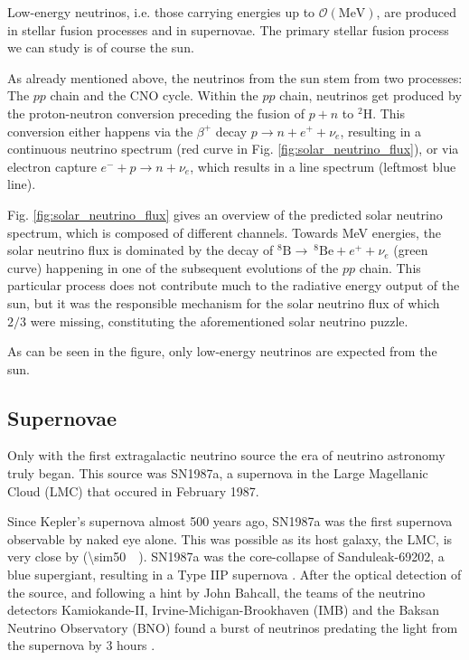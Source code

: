 \documentclass[
    a4paper, %
    fontsize=10pt, %
    twoside=false, %
    numbers=noenddot, %
    fontmethod=tex,
]{kaobook}
\begin{document}
Low-energy neutrinos, i.e. those carrying energies up to $\mathcal{O}(\unit{\mega\eV})$, are produced in stellar fusion processes and in supernovae. The primary stellar fusion process we can study is of course the sun.

As already mentioned above, the neutrinos from the sun stem from two processes: The $pp$ chain and the CNO cycle. Within the $pp$ chain, neutrinos get produced by the proton-neutron conversion preceding the fusion of $p+n$ to $^2 \text{H}$. This conversion either happens via the $\beta^+$ decay $p \rightarrow n + e^+ + \nu_e$, resulting in a continuous neutrino spectrum (red curve in Fig. \ref{fig:solar_neutrino_flux}), or via electron capture $e^- + p \rightarrow n + \nu_e$, which results in a line spectrum (leftmost blue line).

Fig. \ref{fig:solar_neutrino_flux} gives an overview of the predicted solar neutrino spectrum, which is composed of different channels. Towards \unit{\mega\eV} energies, the solar neutrino flux is dominated by the decay of $^8\text{B}\rightarrow ~^8\text{Be} + e^+ + \nu_e$ (green curve) happening in one of the subsequent evolutions of the $pp$ chain. This particular process does not contribute much to the radiative energy output of the sun, but it was the responsible mechanism for the solar neutrino flux of which $2/3$ were missing, constituting the aforementioned solar neutrino puzzle.

As can be seen in the figure, only low-energy neutrinos are expected from the sun.

\subsection{Supernovae} \label{sne}
Only with the first extragalactic neutrino source the era of neutrino astronomy truly began. This source was SN1987a, a supernova in the Large Magellanic Cloud (LMC) that occured in February 1987.

Since Kepler's supernova almost 500 years ago, SN1987a was the first supernova observable by naked eye alone. This was possible as its host galaxy, the LMC, is very close by (\SI{\sim50}{\kilo\parsec}). SN1987a was the core-collapse of Sanduleak-69202, a blue supergiant, resulting in a Type IIP supernova . After the optical detection of the source, and following a hint by John Bahcall, the teams of the neutrino detectors Kamiokande-II, Irvine-Michigan-Brookhaven (IMB) and the Baksan Neutrino Observatory (BNO) found a burst of neutrinos predating the light from the supernova by 3 hours .
\end{document}
